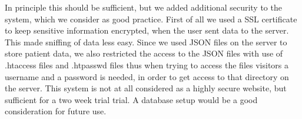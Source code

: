 In principle this should be sufficient, but we added additional security to the system, which we consider as good practice. First of all we used a SSL certificate to keep sensitive information encrypted, when the user sent data to the server. This made sniffing of data less easy. Since we used JSON files on the server to store patient data, we also restricted the access to the JSON files with use of .htaccess files and .htpasswd files thus when trying to access the files visitors a username and a password is needed, in order to get access to that directory on the server. This system is not at all considered as a highly secure website, but sufficient for a two week trial trial. A database setup would be a good consideration for future use.